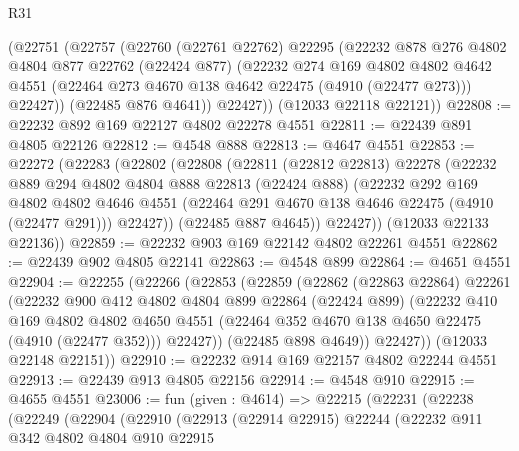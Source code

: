 \begin{lexlean}{R31}
\begin{coremodule}
      (@22751
        (@22757
          (@22760
            (@22761 @22762)
            @22295
            (@22232
              @878
              @276
              @4802
              @4804
              @877
              @22762
              (@22424 @877)
              (@22232
                @274
                @169
                @4802
                @4802
                @4642
                @4551
                (@22464 @273 @4670 @138 @4642 @22475 (@4910 (@22477 @273)))
                @22427))
            (@22485 @876 @4641))
          @22427))
      (@12033 @22118 @22121))
@22808 := @22232 @892 @169 @22127 @4802 @22278 @4551
@22811 := @22439 @891 @4805 @22126
@22812 := @4548 @888
@22813 := @4647 @4551
@22853 := @22272
    (@22283
      (@22802
        (@22808
          (@22811
            (@22812 @22813)
            @22278
            (@22232
              @889
              @294
              @4802
              @4804
              @888
              @22813
              (@22424 @888)
              (@22232
                @292
                @169
                @4802
                @4802
                @4646
                @4551
                (@22464 @291 @4670 @138 @4646 @22475 (@4910 (@22477 @291)))
                @22427))
            (@22485 @887 @4645))
          @22427))
      (@12033 @22133 @22136))
@22859 := @22232 @903 @169 @22142 @4802 @22261 @4551
@22862 := @22439 @902 @4805 @22141
@22863 := @4548 @899
@22864 := @4651 @4551
@22904 := @22255
    (@22266
      (@22853
        (@22859
          (@22862
            (@22863 @22864)
            @22261
            (@22232
              @900
              @412
              @4802
              @4804
              @899
              @22864
              (@22424 @899)
              (@22232
                @410
                @169
                @4802
                @4802
                @4650
                @4551
                (@22464 @352 @4670 @138 @4650 @22475 (@4910 (@22477 @352)))
                @22427))
            (@22485 @898 @4649))
          @22427))
      (@12033 @22148 @22151))
@22910 := @22232 @914 @169 @22157 @4802 @22244 @4551
@22913 := @22439 @913 @4805 @22156
@22914 := @4548 @910
@22915 := @4655 @4551
@23006 := fun (given : @4614) =>
  @22215
    (@22231
      (@22238
        (@22249
          (@22904
            (@22910
              (@22913
                (@22914 @22915)
                @22244
                (@22232
                  @911
                  @342
                  @4802
                  @4804
                  @910
                  @22915

\end{coremodule}
\end{lexlean}
